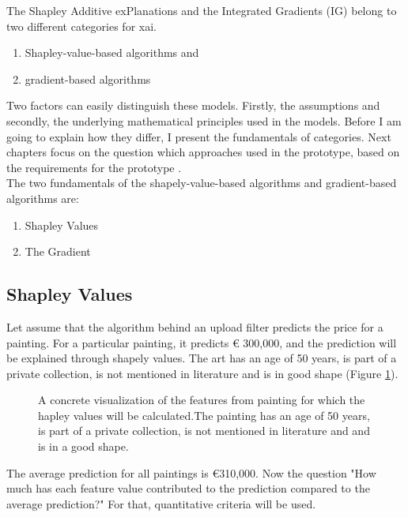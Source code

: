 The Shapley Additive exPlanations and the Integrated Gradients (IG) belong to two different categories for \gls{xai}. 

\begin{enumerate}
	\item Shapley-value-based algorithms and 
	\item gradient-based algorithms 
\end{enumerate}

Two factors can easily distinguish these models. Firstly, the assumptions and secondly, the underlying mathematical principles used in the models. Before I am going to explain how they differ, I present the fundamentals of categories. Next chapters focus on the question which approaches  used in the prototype, based on the requirements for the prototype \cite{MichaelJordan2018} \cite{Kuang2017}.\\

The two fundamentals of the shapely-value-based algorithms and gradient-based algorithms are:

\begin{enumerate}
	\item Shapley Values
	\item The Gradient
\end{enumerate}

\subsection*{Shapley Values}

Let assume that the algorithm behind an upload filter predicts the price for a painting. For a particular painting, it predicts € 300,000, and the prediction will be explained through shapely values. The art has an age of 50 years, is part of a private collection, is not mentioned in literature and is in good shape (Figure \ref{fig:shapley_values_example_01}).\\

\begin{figure}[!htp]
	\centering
	\caption{A concrete visualization of the features from painting for which the hapley values will be calculated.The painting has an age of 50 years, is part of a private collection, is not mentioned in literature and and is in a good shape.}
	\label{fig:shapley_values_example_01}
\end{figure}

The average prediction for all paintings is €310,000. Now the question "How much has each feature value contributed to the prediction compared to the average prediction?" For that, quantitative criteria will be used.

